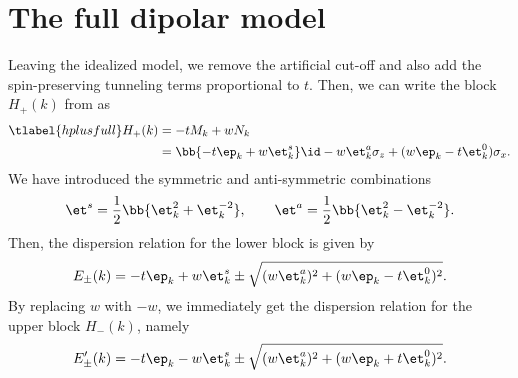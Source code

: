 

\section{The full dipolar model}
Leaving the idealized model, we remove the artificial cut-off and also add the spin-preserving tunneling terms proportional to $t$.
Then, we can write the block $H_+(k)$ from  as
\begin{align} \tlabel{hplusfull}
    H_+(k) &= -t M_k + w N_k \\
           &= \bb{-t \ep_k + w \et^{s}_k} \id - w\et^{a}_k \sigma_z + (w \ep_k - t \et^0_k) \sigma_x.
\end{align}
We have introduced the symmetric and anti-symmetric combinations
\begin{align}
    \et^s = \frac{1}{2} \bb{ \et^2_k + \et^{-2}_{k} }, \qquad
    \et^a = \frac{1}{2} \bb{ \et^2_k - \et^{-2}_{k} }.
\end{align}
Then, the dispersion relation for the lower block is given by
\begin{align}
    E_\pm(k) = -t \ep_k + w \et^s_k \pm \sqrt{(w \et^a_k)^2+(w \ep_k - t \et^0_k)^2}.
\end{align}
By replacing $w$ with $-w$, we immediately get the dispersion relation for the upper block $H_-(k)$, namely
\begin{align}
    E'_\pm(k) = -t \ep_k - w \et^s_k \pm \sqrt{(w \et^a_k)^2+(w \ep_k + t \et^0_k)^2}.
\end{align}

